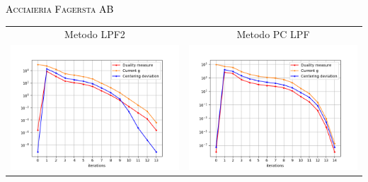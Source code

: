 
\begin{frame}{\textsc{\LARGE \textcolor{black}{Acciaieria Fagersta AB}}}
	\centering
	\begin{tabular}{c@{}c}
		\small{Metodo LPF2} & \small{Metodo PC LPF} \\
		\includegraphics[scale = 0.33]{swe_LPF2}
		&\includegraphics[scale = 0.33]{swe_PCLPF}\\ 
	\end{tabular}
\end{frame}


